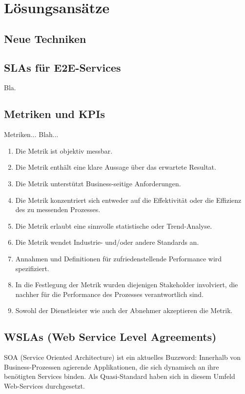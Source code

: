 \documentclass[11pt,listof=totoc]{scrreprt} %
\theoremstyle{definition}
\begin{document}
\chapter{Lösungsansätze}

\section{Neue Techniken}

\section{SLAs für E2E-Services}

Bla. \cite{EllisKauferstein200311}

\section{Metriken und KPIs}

Metriken... Blah... \cite{forrester:slaBestPractices}

\begin{enumerate}
\item Die Metrik ist objektiv messbar.
\item Die Metrik enthält eine klare Aussage über das erwartete Resultat.
\item Die Metrik unterstützt Business-seitige Anforderungen.
\item Die Metrik konzentriert sich entweder auf die Effektivität oder die Effizienz des zu messenden Prozesses.
\item Die Metrik erlaubt eine sinnvolle statistische oder Trend-Analyse.
\item Die Metrik wendet Industrie- und/oder andere Standards an.
\item Annahmen und Definitionen für zufriedenstellende Performance wird spezifiziert.
\item In die Festlegung der Metrik wurden diejenigen Stakeholder involviert, die nachher für die Performance des Prozesses verantwortlich sind.
\item Sowohl der Dienstleister wie auch der Abnehmer akzeptieren die Metrik.
\end{enumerate}

\section{WSLAs (Web Service Level Agreements)}

SOA (Service Oriented Architecture) ist ein aktuelles Buzzword: Innerhalb von Business-Prozessen agierende Applikationen, die sich dynamisch an ihre benötigten Services binden. Als Quasi-Standard haben sich in diesem Umfeld Web-Services durchgesetzt.
\end{document}
